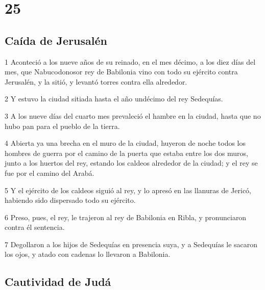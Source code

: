 \chapter{25}

\section*{Caída de Jerusalén }

\par 1 Aconteció a los nueve años de su reinado, en el mes décimo, a los diez días del mes, que Nabucodonosor rey de Babilonia vino con todo su ejército contra Jerusalén, y la sitió, y levantó torres contra ella alrededor. 
\par 2 Y estuvo la ciudad sitiada hasta el año undécimo del rey Sedequías.
\par 3 A los nueve días del cuarto mes prevaleció el hambre en la ciudad, hasta que no hubo pan para el pueblo de la tierra.
\par 4 Abierta ya una brecha en el muro de la ciudad, huyeron de noche todos los hombres de guerra por el camino de la puerta que estaba entre los dos muros, junto a los huertos del rey, estando los caldeos alrededor de la ciudad; y el rey se fue por el camino del Arabá.
\par 5 Y el ejército de los caldeos siguió al rey, y lo apresó en las llanuras de Jericó, habiendo sido dispersado todo su ejército.
\par 6 Preso, pues, el rey, le trajeron al rey de Babilonia en Ribla, y pronunciaron contra él sentencia.
\par 7 Degollaron a los hijos de Sedequías en presencia suya, y a Sedequías le sacaron los ojos, y atado con cadenas lo llevaron a Babilonia. 

\section*{Cautividad de Judá}

